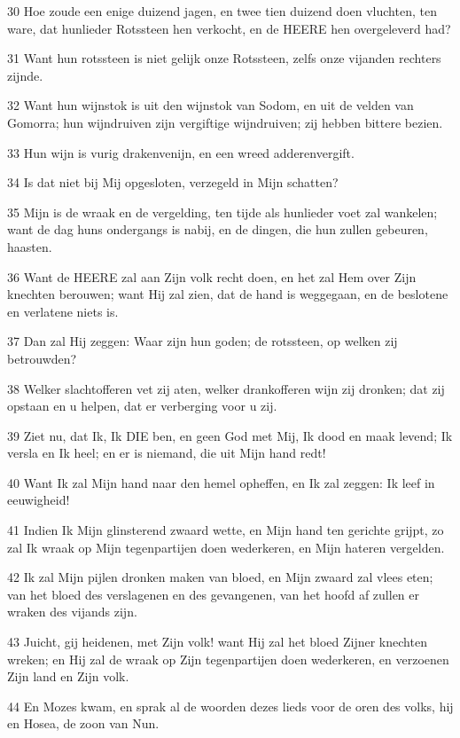 \par 30 Hoe zoude een enige duizend jagen, en twee tien duizend doen vluchten, ten ware, dat hunlieder Rotssteen hen verkocht, en de HEERE hen overgeleverd had?
\par 31 Want hun rotssteen is niet gelijk onze Rotssteen, zelfs onze vijanden rechters zijnde.
\par 32 Want hun wijnstok is uit den wijnstok van Sodom, en uit de velden van Gomorra; hun wijndruiven zijn vergiftige wijndruiven; zij hebben bittere bezien.
\par 33 Hun wijn is vurig drakenvenijn, en een wreed adderenvergift.
\par 34 Is dat niet bij Mij opgesloten, verzegeld in Mijn schatten?
\par 35 Mijn is de wraak en de vergelding, ten tijde als hunlieder voet zal wankelen; want de dag huns ondergangs is nabij, en de dingen, die hun zullen gebeuren, haasten.
\par 36 Want de HEERE zal aan Zijn volk recht doen, en het zal Hem over Zijn knechten berouwen; want Hij zal zien, dat de hand is weggegaan, en de beslotene en verlatene niets is.
\par 37 Dan zal Hij zeggen: Waar zijn hun goden; de rotssteen, op welken zij betrouwden?
\par 38 Welker slachtofferen vet zij aten, welker drankofferen wijn zij dronken; dat zij opstaan en u helpen, dat er verberging voor u zij.
\par 39 Ziet nu, dat Ik, Ik DIE ben, en geen God met Mij, Ik dood en maak levend; Ik versla en Ik heel; en er is niemand, die uit Mijn hand redt!
\par 40 Want Ik zal Mijn hand naar den hemel opheffen, en Ik zal zeggen: Ik leef in eeuwigheid!
\par 41 Indien Ik Mijn glinsterend zwaard wette, en Mijn hand ten gerichte grijpt, zo zal Ik wraak op Mijn tegenpartijen doen wederkeren, en Mijn hateren vergelden.
\par 42 Ik zal Mijn pijlen dronken maken van bloed, en Mijn zwaard zal vlees eten; van het bloed des verslagenen en des gevangenen, van het hoofd af zullen er wraken des vijands zijn.
\par 43 Juicht, gij heidenen, met Zijn volk! want Hij zal het bloed Zijner knechten wreken; en Hij zal de wraak op Zijn tegenpartijen doen wederkeren, en verzoenen Zijn land en Zijn volk.
\par 44 En Mozes kwam, en sprak al de woorden dezes lieds voor de oren des volks, hij en Hosea, de zoon van Nun.
